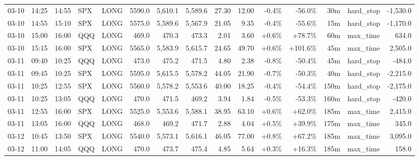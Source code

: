 \documentclass[11pt,a4paper,twoside]{article}
\begin{document}
\begin{landscape}
\begin{center}
\begin{longtable}{>{\color{txtmain}}l l l l l r r r r r r r r >{\color{txtmain}}l r}
03-10 & 14:25 & 14:55 & SPX & LONG & 5590.0 & 5,610.1 & 5,589.6 & 27.30 & 12.00 & \textcolor{lossred}{-0.4\%} & \textcolor{lossred}{-56.0\%} & 30m & hard\_stop & \textcolor{lossred}{-1,530.0} \\
03-10 & 14:55 & 15:10 & SPX & LONG & 5575.0 & 5,589.6 & 5,567.9 & 21.05 & 9.35 & \textcolor{lossred}{-0.4\%} & \textcolor{lossred}{-55.6\%} & 15m & hard\_stop & \textcolor{lossred}{-1,170.0} \\
03-10 & 15:00 & 16:00 & QQQ & LONG & 469.0 & 470.3 & 473.3 & 2.01 & 3.60 & \textcolor{wingreen}{+0.6\%} & \textcolor{wingreen}{+78.7\%} & 60m & max\_time & \textcolor{wingreen}{634.0} \\
03-10 & 15:15 & 16:00 & SPX & LONG & 5565.0 & 5,583.9 & 5,615.7 & 24.65 & 49.70 & \textcolor{wingreen}{+0.6\%} & \textcolor{wingreen}{+101.6\%} & 45m & max\_time & \textcolor{wingreen}{2,505.0} \\
03-11 & 09:40 & 10:25 & QQQ & LONG & 473.0 & 475.2 & 471.5 & 4.80 & 2.38 & \textcolor{lossred}{-0.8\%} & \textcolor{lossred}{-50.4\%} & 45m & hard\_stop & \textcolor{lossred}{-484.0} \\
03-11 & 09:45 & 10:25 & SPX & LONG & 5595.0 & 5,615.5 & 5,578.2 & 44.05 & 21.90 & \textcolor{lossred}{-0.7\%} & \textcolor{lossred}{-50.3\%} & 40m & hard\_stop & \textcolor{lossred}{-2,215.0} \\
03-11 & 10:25 & 12:55 & SPX & LONG & 5560.0 & 5,578.2 & 5,553.6 & 40.00 & 18.25 & \textcolor{lossred}{-0.4\%} & \textcolor{lossred}{-54.4\%} & 150m & hard\_stop & \textcolor{lossred}{-2,175.0} \\
03-11 & 10:25 & 13:05 & QQQ & LONG & 470.0 & 471.5 & 469.2 & 3.94 & 1.84 & \textcolor{lossred}{-0.5\%} & \textcolor{lossred}{-53.3\%} & 160m & hard\_stop & \textcolor{lossred}{-420.0} \\
03-11 & 12:55 & 16:00 & SPX & LONG & 5525.0 & 5,553.6 & 5,588.1 & 38.95 & 63.10 & \textcolor{wingreen}{+0.6\%} & \textcolor{wingreen}{+62.0\%} & 185m & max\_time & \textcolor{wingreen}{2,415.0} \\
03-11 & 13:05 & 16:00 & QQQ & LONG & 468.0 & 469.2 & 471.7 & 2.88 & 4.04 & \textcolor{wingreen}{+0.5\%} & \textcolor{wingreen}{+39.9\%} & 175m & max\_time & \textcolor{wingreen}{345.0} \\
03-12 & 10:45 & 13:50 & SPX & LONG & 5540.0 & 5,573.1 & 5,616.1 & 46.05 & 77.00 & \textcolor{wingreen}{+0.8\%} & \textcolor{wingreen}{+67.2\%} & 185m & max\_time & \textcolor{wingreen}{3,095.0} \\
03-12 & 11:00 & 14:05 & QQQ & LONG & 470.0 & 473.7 & 475.4 & 4.85 & 5.64 & \textcolor{wingreen}{+0.3\%} & \textcolor{wingreen}{+16.3\%} & 185m & max\_time & \textcolor{wingreen}{158.0} \\

\end{longtable}
\end{center}
\end{landscape}
\end{document}
